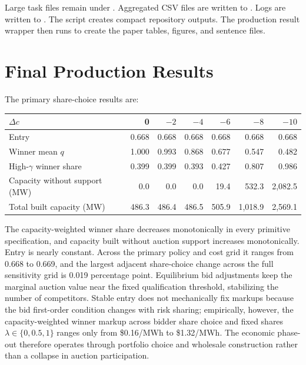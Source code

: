 \documentclass[10pt]{article}
\begin{document}
\begin{sloppypar}
Large task files remain under
.  Aggregated
CSV files are written to
.  Logs are
written to .  The script
 creates compact repository outputs.  The
production result wrapper then runs  to
create the paper tables, figures, and sentence files.
\end{sloppypar}

\section{Final Production Results}

The primary share-choice results are:
\begin{center}
\begin{tabular}{lrrrrrr}
\toprule
$\Delta c$ & 0 & $-2$ & $-4$ & $-6$ & $-8$ & $-10$\\
\midrule
Entry & 0.668 & 0.668 & 0.668 & 0.668 & 0.668 & 0.668\\
Winner mean $q$ & 1.000 & 0.993 & 0.868 & 0.677 & 0.547 & 0.482\\
High-$\gamma$ winner share & 0.399 & 0.399 & 0.393 & 0.427 & 0.807 & 0.986\\
Capacity without support (MW) & 0.0 & 0.0 & 0.0 & 19.4 & 532.3 & 2,082.5\\
Total built capacity (MW) & 486.3 & 486.4 & 486.5 & 505.9 & 1,018.9 & 2,569.1\\
\bottomrule
\end{tabular}
\end{center}
The capacity-weighted winner share decreases monotonically in every primitive
specification, and capacity built without auction support increases monotonically.  Entry is
nearly constant.  Across the primary policy and cost grid it ranges from
0.668 to 0.669, and the largest adjacent share-choice change across the full
sensitivity grid is 0.019 percentage point.  Equilibrium bid adjustments keep
the marginal auction value near the fixed qualification threshold, stabilizing
the number of competitors.  Stable entry does not mechanically fix markups
because the bid first-order condition changes with risk sharing; empirically,
however, the capacity-weighted winner markup across bidder share choice and
fixed shares $\lambda\in\{0,0.5,1\}$ ranges only from \$0.16/MWh to
\$1.32/MWh.  The economic phase-out therefore operates through
portfolio choice and wholesale construction rather than a collapse in auction
participation.
\end{document}
